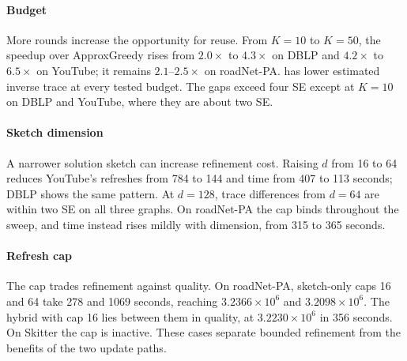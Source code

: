 \paragraph{Budget}
More rounds increase the opportunity for reuse. From $K=10$ to
$K=50$, the speedup over ApproxGreedy rises from $2.0\times$ to
$4.3\times$ on DBLP and $4.2\times$ to $6.5\times$ on YouTube;
it remains $2.1$--$2.5\times$ on roadNet-PA. \alg{} has lower
estimated inverse trace at every tested budget. The gaps exceed
four SE except at $K=10$ on DBLP and YouTube, where they are
about two SE.

\paragraph{Sketch dimension}
A narrower solution sketch can increase refinement cost. Raising $d$ from 16
to 64 reduces YouTube's refreshes from 784 to 144 and time from
407 to 113 seconds; DBLP shows the same pattern. At $d=128$,
trace differences from $d=64$ are within two SE on all three graphs.
On roadNet-PA the cap binds throughout the sweep, and time instead
rises mildly with dimension, from 315 to 365 seconds.

\paragraph{Refresh cap}
The cap trades refinement against quality. On roadNet-PA,
sketch-only caps 16 and 64 take 278 and 1069 seconds, reaching
$3.2366\times10^6$ and $3.2098\times10^6$. The hybrid with cap
16 lies between them in quality, at $3.2230\times10^6$ in 356
seconds. On Skitter the cap is inactive. These cases separate
bounded refinement from the benefits of the two update paths.

